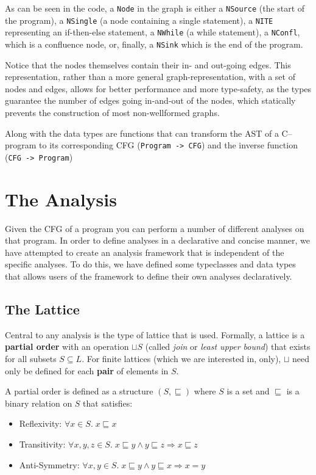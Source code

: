 \documentclass{article}
\begin{document}
As can be seen in the code, a \texttt{Node} in the graph is either a
\texttt{NSource} (the start of the program), a \texttt{NSingle} (a node
containing a single statement), a \texttt{NITE} representing an
if-then-else statement, a \texttt{NWhile} (a while statement), a
\texttt{NConfl}, which is a confluence node, or, finally, a
\texttt{NSink} which is the end of the program.

Notice that the nodes themselves contain their in- and out-going edges.
This representation, rather than a more general graph-representation,
with a set of nodes and edges, allows for better performance and more
type-safety, as the types guarantee the number of edges going in-and-out
of the nodes, which statically prevents the construction of most
non-wellformed graphs.

Along with the data types are functions that can transform the
AST of a C-- program to its corresponding CFG
(\texttt{Program -\textgreater{} CFG}) and the inverse function
(\texttt{CFG -\textgreater{} Program})

\section{The Analysis}\label{the-analysis}

Given the CFG of a program you can perform a number of different
analyses on that program. In order to define analyses in a declarative
and concise manner, we have attempted to create an analysis framework that
is independent of the specific analyses. To do this, we have defined
some typeclasses and data types that allows users of the framework to
define their own analyses declaratively.

\subsection{The Lattice}\label{the-lattice}

Central to any analysis is the type of lattice that is used. Formally, a
lattice is a \textbf{partial order} with an operation $⊔S$ (called
\emph{join} or \emph{least upper bound}) that exists for all subsets
$S ⊆ L$. For finite lattices (which we are interested in, only), $⊔$
need only be defined for each \textbf{pair} of elements in $S$.

A partial order is defined as a structure $(S, ⊑)$ where $S$ is a set
and $⊑$ is a binary relation on $S$ that satisfies:

\begin{itemize}
\itemsep1pt\parskip0pt
\item
  Reflexivity: $∀x ∈ S.\; x ⊑ x$
\item
  Transitivity: $∀x,y,z ∈ S.\;  x ⊑ y ∧ y ⊑ z ⇒ x ⊑ z$
\item
  Anti-Symmetry: $∀x,y ∈ S.\; x ⊑ y ∧ y ⊑ x ⇒ x = y$
\end{itemize}
\end{document}
